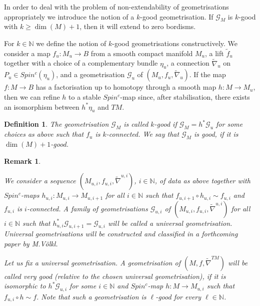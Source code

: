 \documentclass[12pt]{article}
\newtheorem{ddd}[theorem]{Definition}
\newtheorem{rem}[theorem]{Remark}
\newcommand{\cG}{{\mathcal{G}}}
\newcommand{\nat}{{\mathbb{N}}}
\begin{document}
  
  





 In order to deal with the problem of non-extendability of geometrisations appropriately we introduce the notion of a $k$-good geometrisation. If $\cG_{M}$ is $k$-good with $k\ge \dim(M)+1$, then it will extend to zero bordisms.

For $k\in \nat$ we define the notion of $k$-good geometrisations constructively.  
We consider a map    $f_{u}:M_{u}\to B$ from a smooth compact manifold $M_{u}$, a lift $\tilde f_{u}$ together with a choice of a complementary bundle $\eta_{u}$, a connection $\tilde \nabla_{u}$ on $P_{u}\in Spin^{c}(\eta_{u})$, and
a geometrisation
$\cG_{u}$ of
$(M_{u},f_{u},\tilde \nabla_{u})$. If the map  $f:M\to B$  has a   factorisation up to homotopy through a smooth map $h:M\to M_{u}$, then we can refine $h$ to    
a stable $Spin^{c}$-map since, after stabilisation, there exists an isomorphism between $h^{*}\eta_{u}
$ and $TM$.
\begin{ddd}\label{goodgeom}
The geometrisation $\cG_{M}$ is called $k$-good if $\cG_{M}=h^{*}\cG_{u}$
for some choices as above such that $f_{u}$ is $k$-connected.
We say that $\cG_{M}$ is good, if it is $\dim(M)+1$-good. \end{ddd}


\begin{rem}\label{kdsdkfsdf}{\rm
We consider a sequence $(M_{u,i},f_{u,i},\tilde \nabla^{u,i})$, $i\in \nat$, of data as
above together with $Spin^{c}$-maps $h_{u,i}:M_{u,i}\to M_{u,i+1}$ for all $i\in \nat$ such that
$f_{u,i+1}\circ h_{u,i}\sim f_{u,i}$ and $f_{u,i}$ is $i$-connected. A family of geometrisations $\cG_{u,i}$ of $(M_{u,i},f_{u,i},\tilde \nabla^{u,i})$ for all $i\in \nat$  such that $h_{u,i}^{*}\cG_{u,i+1}=\cG_{u,i}$ will be called a universal geometrisation. Universal geometrisations will be constructed and classified in a forthcoming paper by M.V\"olkl.

Let us fix a universal geometrisation. A geometrisation of $(M,f,\tilde \nabla^{TM})$ will be called very good (relative to the chosen universal geometrisation), if it is isomorphic to $
h^{*}\cG_{u,i}$ for some $i\in \nat$ and $Spin^{c}$-map $h:M\to M_{u,i}$ such that $f_{u,i}\circ h\sim f$. Note that such a geometrisation is $\ell$-good for every $\ell\in \nat$.}
\end{rem}
\end{document}
